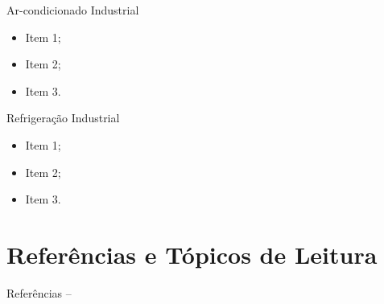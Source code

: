     \begin{frame}{Ar-condicionado Industrial}\vspace*{-0em}
        \begin{itemize}
            \item<1-> Item 1;
            \item<2-> Item 2;
            \item<3-> Item 3.
        \end{itemize}
    \end{frame}

    \begin{frame}{Refrigeração Industrial}\vspace*{-0em}
        \begin{itemize}
            \item<1-> Item 1;
            \item<2-> Item 2;
            \item<3-> Item 3.
        \end{itemize}
    \end{frame}

\section{Referências e Tópicos de Leitura}

    \begin{frame}[allowframebreaks]{Referências -- }
        
        
    \end{frame}




